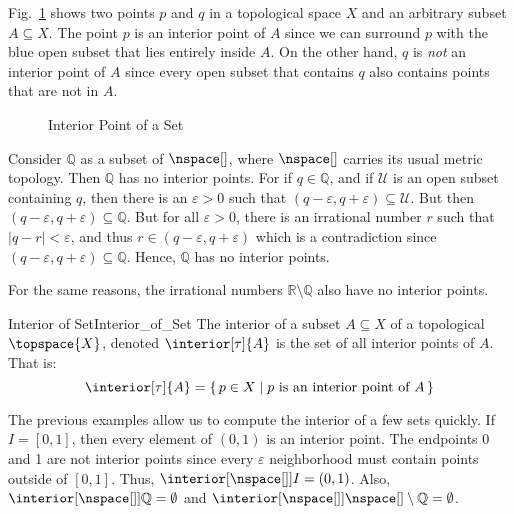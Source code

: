         Fig.~\ref{fig:Interior_Point_of_Set} shows two points $p$ and $q$ in
        a topological space $X$ and an arbitrary subset $A\subseteq{X}$. The
        point $p$ is an interior point of $A$ since we can surround $p$ with
        the blue open subset that lies entirely inside $A$. On the other
        hand, $q$ is \textit{not} an interior point of $A$ since every open
        subset that contains $q$ also contains points that are not in $A$.
        \begin{figure}[H]
            \centering
            \captionsetup{type=figure}
            
            \caption{Interior Point of a Set}
            \label{fig:Interior_Point_of_Set}
        \end{figure}
        \begin{example}
            Consider $\mathbb{Q}$ as a subset of $\nspace[]$, where
            $\nspace[]$ carries its usual metric topology. Then $\mathbb{Q}$
            has no interior points. For if $q\in\mathbb{Q}$, and if
            $\mathcal{U}$ is an open subset containing $q$, then there is an
            $\varepsilon>0$ such that
            $(q-\varepsilon,q+\varepsilon)\subseteq\mathcal{U}$. But then
            $(q-\varepsilon,q+\varepsilon)\subseteq\mathbb{Q}$. But for all
            $\varepsilon>0$, there is an irrational number $r$ such that
            $|q-r|<\varepsilon$, and thus
            $r\in(q-\varepsilon,q+\varepsilon)$ which is a contradiction
            since $(q-\varepsilon,q+\varepsilon)\subseteq\mathbb{Q}$. Hence,
            $\mathbb{Q}$ has no interior points.
        \end{example}
        \begin{example}
            For the same reasons, the irrational numbers
            $\mathbb{R}\setminus\mathbb{Q}$ also have no interior points.
        \end{example}
        \begin{fdefinition}{Interior of Set}{Interior_of_Set}
            The interior of a subset $A\subseteq{X}$ of a topological
            $\topspace{X}$, denoted $\interior[\tau]{A}$ is the set of all
            interior points of $A$. That is:
            \begin{equation*}
                \interior[\tau]{A}=\{\,p\in{X}\;|\;p
                    \textrm{ is an interior point of }A\,\}
            \end{equation*}
        \end{fdefinition}
        \begin{example}
            The previous examples allow us to compute the interior of a few
            sets quickly. If $I=[0,1]$, then every element of $(0,1)$ is an
            interior point. The endpoints 0 and 1 are not interior points
            since every $\varepsilon$ neighborhood must contain points
            outside of $[0,1]$. Thus, $\interior[{\nspace[]}]{I}=(0,1)$.
            Also, $\interior[{\nspace[]}]{\mathbb{Q}}=\emptyset$ and
            $\interior[{\nspace[]}]{\nspace[]\setminus\mathbb{Q}}=\emptyset$.
        \end{example}
